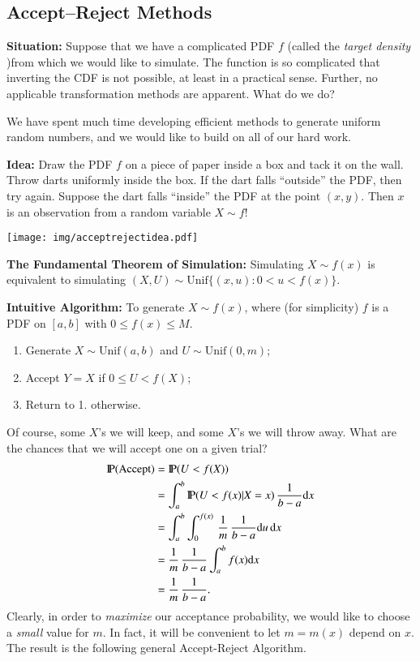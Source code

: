 \documentclass[captions=tableheading]{scrbook}
\begin{document}
\subsection{Accept--Reject Methods}
\label{sec-2_3_3}


\textbf{Situation:} Suppose that we have a complicated PDF $f$ (called the \emph{target density} )from which we would like to simulate. The function is so complicated that inverting the CDF is not possible, at least in a practical sense. Further, no applicable transformation methods are apparent. What do we do?

We have spent much time developing efficient methods to generate uniform random numbers, and we would like to build on all of our hard work.

\textbf{Idea:} Draw the PDF $f$ on a piece of paper inside a box and tack it on the wall. Throw darts uniformly inside the box. If the dart falls ``outside'' the PDF, then try again. Suppose the dart falls ``inside'' the PDF at the point $(x,y)$. Then $x$ is an observation from a random variable \(X\sim f\)!

\begin{center}

\texttt{[image: img/acceptrejectidea.pdf]}

\end{center}

\textbf{The Fundamental Theorem of Simulation:} Simulating $X\sim f(x)$ is equivalent to simulating $(X,U)\sim \mathrm{Unif}\{(x,u):0 < u < f(x)\}$.

\textbf{Intuitive Algorithm:} To generate $X \sim f(x)$, where (for simplicity) $f$ is a PDF on $[a,b]$ with $0\leq f(x)\leq M$.

\begin{enumerate}
\item Generate $X\sim\mathrm{Unif}(a,b)$ and $U\sim\mathrm{Unif}(0,m)$;
\item Accept $Y = X$ if $0 \leq U < f(X)$;
\item Return to 1. otherwise.
\end{enumerate}

Of course, some $X$'s we will keep, and some $X$'s we will throw away. What are the chances that we will accept one on a given trial?
\begin{align*}
\mathrm{I\hspace{-1.5pt}P}(\mbox{Accept}) & =\mathrm{I\hspace{-1.5pt}P}(U < f(X))\\
 & =\int_{a}^{b}\mathrm{I\hspace{-1.5pt}P}(U < f(x)|X=x)\,\frac{1}{b-a}\mathrm{d} x\\
 & =\int_{a}^{b}\int_{0}^{f(x)}\,\frac{1}{m}\,\frac{1}{b-a}\mathrm{d} u\,\mathrm{d} x\\
 & =\frac{1}{m}\,\frac{1}{b-a}\int_{a}^{b}f(x)\mathrm{d} x\\
 & =\frac{1}{m}\,\frac{1}{b-a}.
\end{align*}
Clearly, in order to \emph{maximize} our acceptance probability, we would like to choose a \emph{small} value for $m$. In fact, it will be convenient to let $m=m(x)$ depend on $x$. The result is the following general Accept-Reject Algorithm.
\end{document}
